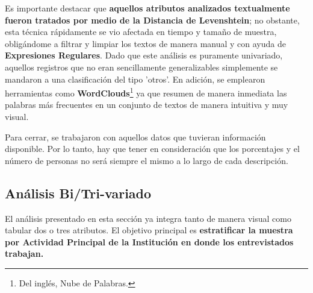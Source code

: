 \documentclass{article}
\begin{document}
Es importante destacar que \textbf{aquellos atributos analizados textualmente fueron tratados por medio de la Distancia de Levenshtein}; no obstante, esta técnica rápidamente se vio afectada en tiempo y tamaño de muestra, obligándome a filtrar y limpiar los textos de manera manual y con ayuda de \textbf{Expresiones Regulares}. Dado que este análisis es puramente univariado, aquellos registros que no eran sencillamente generalizables simplemente se mandaron a una clasificación del tipo 'otros'. En adición, se emplearon herramientas como \textbf{WordClouds}\footnote{Del inglés, Nube de Palabras.} ya que resumen de manera inmediata las palabras más frecuentes en un conjunto de textos de manera intuitiva y muy visual.

Para cerrar, se trabajaron con aquellos datos que tuvieran información disponible. Por lo tanto, hay que tener en consideración que los porcentajes y el número de personas no será siempre el mismo a lo largo de cada descripción. 

\subsection{Análisis Bi/Tri-variado}

El análisis presentado en esta sección ya integra tanto de manera visual como tabular dos o tres atributos. El objetivo principal es \textbf{estratificar la muestra por Actividad Principal de la Institución en donde los entrevistados trabajan.} 
\end{document}
